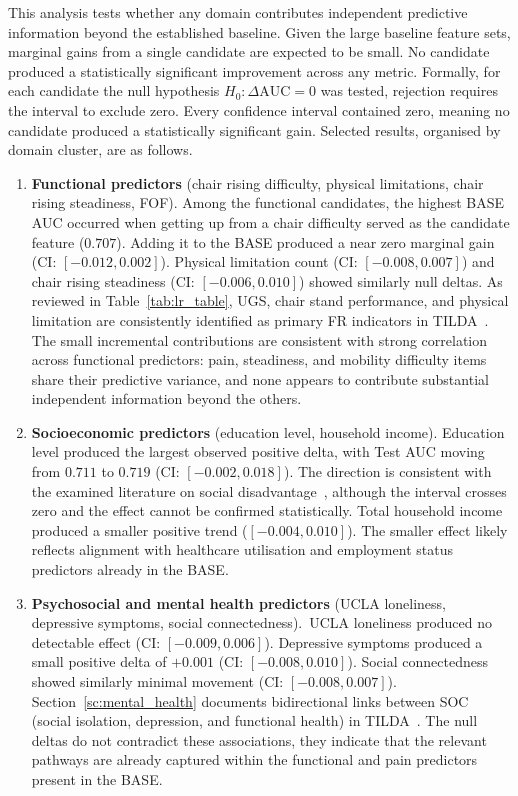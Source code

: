 This analysis tests whether any domain contributes independent predictive information beyond the established baseline. Given the large baseline feature sets, marginal gains from a single candidate are expected to be small. No candidate produced a statistically significant improvement across any metric. Formally, for each candidate the null hypothesis $H_0\colon \Delta\text{AUC} = 0$ was tested, rejection requires the interval to exclude zero. Every confidence interval contained zero, meaning no candidate produced a statistically significant gain. Selected results, organised by domain cluster, are as follows.
\begin{enumerate}[label= (\roman*)]
    \item \textbf{Functional predictors} (chair rising difficulty, physical limitations, chair rising steadiness, \gls{FOF}). Among the functional candidates, the highest BASE \gls{AUC} occurred when getting up from a chair difficulty served as the candidate feature ($0.707$). Adding it to the BASE produced a near zero marginal gain (\gls{CI}: $[-0.012, 0.002]$). Physical limitation count (\gls{CI}: $[-0.008, 0.007]$) and chair rising steadiness (\gls{CI}: $[-0.006, 0.010]$) showed similarly null deltas. As reviewed in Table~\ref{tab:lr_table}, \gls{UGS}, chair stand performance, and physical limitation are consistently identified as primary \gls{FR} indicators in \gls{TILDA}~\cite{davisComparisonGaitSpeed2021}. The small incremental contributions are consistent with strong correlation across functional predictors: pain, steadiness, and mobility difficulty items share their predictive variance, and none appears to contribute substantial independent information beyond the others.
    \item \textbf{Socioeconomic predictors} (education level, household income). Education level produced the largest observed positive delta, with Test \gls{AUC} moving from $0.711$ to $0.719$ (\gls{CI}: $[-0.002, 0.018]$). The direction is consistent with the examined literature on social disadvantage~\cite{mccrorySocialDisadvantageSocial2016}, although the interval crosses zero and the effect cannot be confirmed statistically. Total household income produced a smaller positive trend ($[-0.004, 0.010]$). The smaller effect likely reflects alignment with healthcare utilisation and employment status predictors already in the BASE.\
    \item \textbf{Psychosocial and mental health predictors} (\gls{UCLA} loneliness, depressive symptoms, social connectedness).\ \gls{UCLA} loneliness produced no detectable effect (\gls{CI}: $[-0.009, 0.006]$). Depressive symptoms produced a small positive delta of $+0.001$ (\gls{CI}: $[-0.008, 0.010]$). Social connectedness showed similarly minimal movement (\gls{CI}: $[-0.008, 0.007]$). Section~\ref{sc:mental_health} documents bidirectional links between \gls{SOC} (social isolation, depression, and functional health) in \gls{TILDA}~\cite{santiniProtectivePropertiesActBelongCommit2017,jacobFallsIncreaseRisk2023}. The null deltas do not contradict these associations, they indicate that the relevant pathways are already captured within the functional and pain predictors present in the BASE.\

\end{enumerate}
